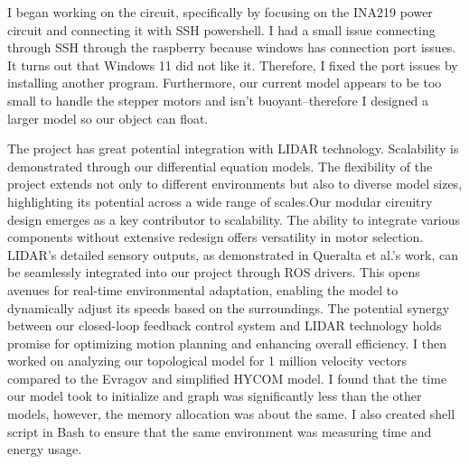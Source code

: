 
I began working on the circuit, specifically by focusing on the INA219 power circuit and connecting it with SSH powershell. I had a small issue connecting through SSH through the raspberry because windows has connection port issues. It turns out that Windows 11 did not like it. Therefore, I fixed the port issues by installing another program. Furthermore, our current model appears to be too small to handle the stepper motors and isn't buoyant--therefore I designed a larger model so our object can float.

\newpage


The project has great potential integration with LIDAR technology. Scalability is demonstrated through our differential equation models. The flexibility of the project extends not only to different environments but also to diverse model sizes, highlighting its potential across a wide range of scales.Our modular circuitry design emerges as a key contributor to scalability. The ability to integrate various components without extensive redesign offers versatility in motor selection. LIDAR's detailed sensory outputs, as demonstrated in Queralta et al.'s work, can be seamlessly integrated into our project through ROS drivers. This opens avenues for real-time environmental adaptation, enabling the model to dynamically adjust its speeds based on the surroundings. The potential synergy between our closed-loop feedback control system and LIDAR technology holds promise for optimizing motion planning and enhancing overall efficiency. I then worked on analyzing our topological model for 1 million velocity vectors compared to the Evragov and simplified HYCOM model. I found that the time our model took to initialize and graph was significantly less than the other models, however, the memory allocation was about the same. I also created shell script in Bash to ensure that the same environment was measuring time and energy usage.

\newpage

